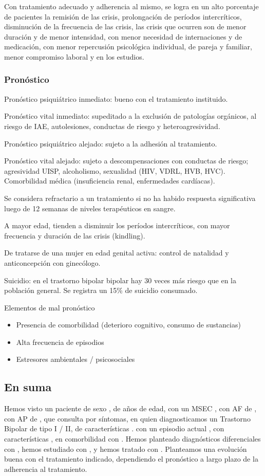 \documentclass{scrbook}
\begin{document}
Con tratamiento adecuado y adherencia al mismo, se logra en un alto porcentaje de pacientes la remisión de las crisis, prolongación de períodos intercríticos, disminución de la frecuencia de las crisis, las crisis que ocurren son de menor duración y de menor intensidad, con menor necesidad de internaciones y de medicación, con menor repercusión psicológica individual, de pareja y familiar, menor compromiso laboral y en los estudios.
\subsubsection*{Pronóstico}
Pronóstico psiquiátrico inmediato: bueno con el tratamiento instituido.

Pronóstico vital inmediato: supeditado a la exclusión de patologías orgánicos, al riesgo de IAE, autolesiones, conductas de riesgo y heteroagresividad.

Pronóstico psiquiátrico alejado: sujeto a la adhesión al tratamiento.

Pronóstico vital alejado: sujeto a descompensaciones con conductas de riesgo; agresividad UISP, alcoholismo, sexualidad (HIV, VDRL, HVB, HVC). Comorbilidad médica (insuficiencia renal, enfermedades cardíacas).

Se considera refractario a un tratamiento si no ha habido respuesta significativa luego de 12 semanas de niveles terapéuticos en sangre.

A mayor edad, tienden a disminuir los períodos intercríticos, con mayor frecuencia y duración de las crisis (kindling).

De tratarse de una mujer en edad genital activa: control de natalidad y anticoncepción con ginecólogo.

Suicidio: en el trastorno bipolar bipolar hay 30 veces más riesgo que en la población general. Se registra un 15\% de suicidio consumado.

Elementos de mal pronóstico
\begin{itemize}
	\item Presencia de comorbilidad (deterioro cognitivo, consumo de sustancias)
	\item Alta frecuencia de episodios
	\item Estresores ambientales / psicosociales
\end{itemize}
\subsection*{En suma}
Hemos visto un paciente de sexo \faQuestionCircle, de \faQuestionCircle años de edad, con un MSEC \faQuestionCircle, con AF de \faQuestionCircle, con AP de \faQuestionCircle, que consulta por \faQuestionCircle síntomas, en quien diagnosticamos un Trastorno Bipolar de tipo I / II, de características \faQuestionCircle. con un episodio actual \faQuestionCircle, con características \faQuestionCircle, en comorbilidad con \faQuestionCircle. Hemos planteado diagnósticos diferenciales con \faQuestionCircle, hemos estudiado con \faQuestionCircle, y hemos tratado con \faQuestionCircle. Planteamos una evolución buena con el tratamiento indicado, dependiendo el pronóstico a largo plazo de la adherencia al tratamiento.
\end{document}
